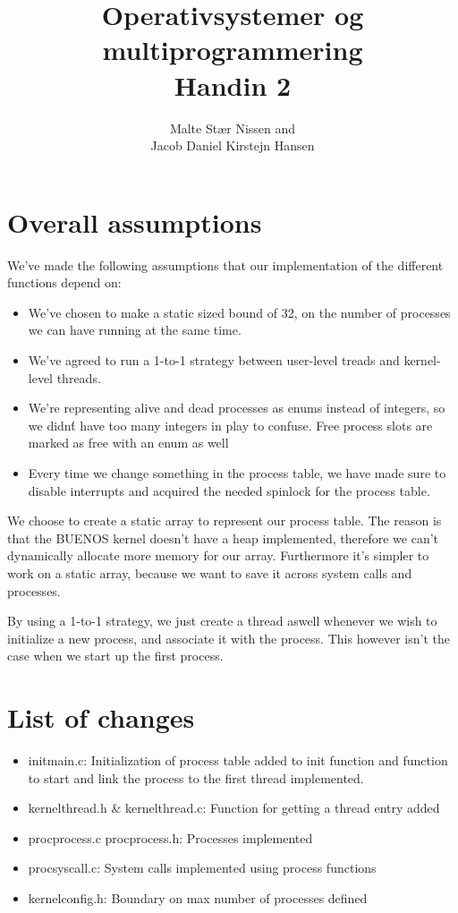 \documentclass[11pt,a4paper]{article}
\title{Operativsystemer og multiprogrammering \\ Handin 2}
\author{Malte Stær Nissen and \\ 
        Jacob Daniel Kirstejn Hansen}
\begin{document}
\maketitle

\tableofcontents
\newpage

\section{Overall assumptions}
We've made the following assumptions that our implementation of the different
functions depend on:

\begin{itemize}
    \item We've chosen to make a static sized bound of 32, on the number of
    processes we can have running at the same time.
    \item We've agreed to run a 1-to-1 strategy between user-level treads and
    kernel-level threads.
    \item We're representing alive and dead processes as enums instead of
    integers, so we didn\'t have too many integers in play to confuse.
	Free process slots are marked as free with an enum as well
	\item Every time we change something in the process table, we have made
	sure to disable interrupts and acquired the needed spinlock for the process table.
\end{itemize}

We choose to create a static array to represent our process table. The reason
is that the BUENOS kernel doesn't have a heap implemented, therefore we can't
dynamically allocate more memory for our array. Furthermore it's simpler to
work on a static array, because we want to save it across system calls and
processes.

By using a 1-to-1 strategy, we just create a thread aswell whenever we wish to initialize a new process, and associate it with the process.
This however isn't the case when we start up the first process.

\section{List of changes}

\begin{itemize}
    \item init\/main.c: Initialization of process table added to init\(\)
    function and function to start and link the process to the first thread
    implemented.
    \item kernel\/thread.h \& kernel\/thread.c: Function for getting a thread entry added
	\item proc\/process.c \/ proc\/process.h: Processes implemented
	\item proc\/syscall.c: System calls implemented using process functions
	\item kernel\/config.h: Boundary on max number of processes defined
\end{itemize}
\end{document}
